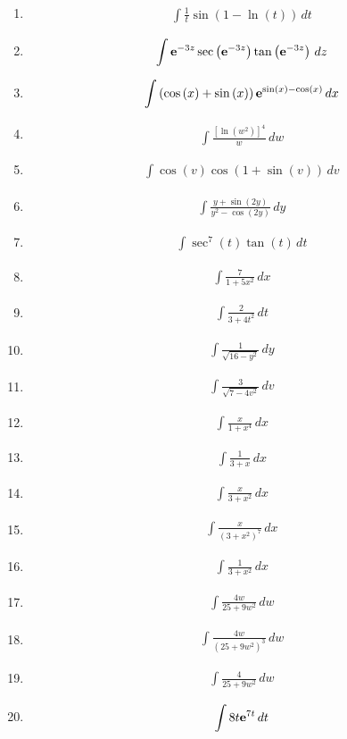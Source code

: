 \documentclass[twoside, fleqn,12pt,letterpaper]{book}
\newcommand{\makeitem}[2]{\item {#2}\begin{align*} {#1}
  \end{align*}}
\newcommand{\makeitemlamar}[1]{\makeitem{{#1}}{\cite{lamar}}}
\begin{document}
\begin{multicols}{2}
\begin{enumerate}
  \makeitemlamar{\displaystyle \int   {{\frac{1}{t}\sin \left( {1 - \ln \left( t \right)} \right)\,dt}}}
  
  \makeitemlamar{\displaystyle \int   {{{{\bf{e}}^{ - 3z}}\sec \left( {{{\bf{e}}^{ - 3z}}} \right)\tan \left( {{{\bf{e}}^{ - 3z}}} \right)\,dz}}}
  
  \makeitemlamar{\displaystyle \int   {{\left( {\cos \left( x \right) + \sin \left( x \right)} \right){{\bf{e}}^{\sin \left( x \right) - \cos \left( x \right)}}\,dx}}}
  
  \makeitemlamar{\displaystyle \int   {{\frac{{{{\left[ {\ln \left( {{w^2}} \right)} \right]}^4}}}{w}\,dw}}}
  
  \makeitemlamar{\displaystyle \int   {{\cos \left( v \right)\cos \left( {1 + \sin \left( v \right)} \right)\,dv}}}
  
  \makeitemlamar{\displaystyle \int   {{\frac{{y + \sin \left( {2y} \right)}}{{{y^2} - \cos \left( {2y} \right)}}\,dy}}}
  
  \makeitemlamar{\displaystyle \int   {{{{\sec }^7}\left( t \right)\tan \left( t \right)\,dt}}}
  
  \makeitemlamar{\displaystyle \int   {{\frac{7}{{1 + 5{x^2}}}\,dx}}}
  
  \makeitemlamar{\displaystyle \int   {{\frac{2}{{3 + 4{t^2}}}\,dt}}}
  
  \makeitemlamar{\displaystyle \int   {{\frac{1}{{\sqrt {16 - {y^2}} }}\,dy}}}
  
  \makeitemlamar{\displaystyle \int   {{\frac{3}{{\sqrt {7 - 4{v^2}} }}\,dv}}}
  
  \makeitemlamar{\displaystyle \int   {{\frac{x}{{1 + {x^4}}}\,dx}}}
  
  \makeitemlamar{\displaystyle \int   {{\frac{1}{{3 + x}}\,dx}}}
  
  \makeitemlamar{\displaystyle \int   {{\frac{x}{{3 + {x^2}}}\,dx}}}
  
  \makeitemlamar{\displaystyle \int   {{\frac{x}{{{{\left( {3 + {x^2}} \right)}^7}}}\,dx}}}
  
  \makeitemlamar{\displaystyle \int   {{\frac{1}{{3 + {x^2}}}\,dx}}}
  
  \makeitemlamar{\displaystyle \int   {{\frac{{4w}}{{25 + 9{w^2}}}\,dw}}}
  
  \makeitemlamar{\displaystyle \int   {{\frac{{4w}}{{{{\left( {25 + 9{w^2}} \right)}^3}}}\,dw}}}
  
  \makeitemlamar{\displaystyle \int   {{\frac{4}{{25 + 9{w^2}}}\,dw}}}
  
  \makeitemlamar{\displaystyle \int{{8t{{\bf{e}}^{7t}}\,dt}}}
  

\end{enumerate}
\end{multicols}
\end{document}
